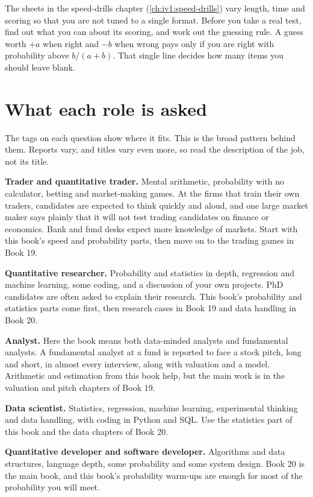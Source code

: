 The sheets in the speed-drills chapter (\cref{ch:iv1:speed-drills}) vary length, time and scoring so that you are not tuned to a single format. Before you take a real test, find out what you can about its scoring, and work out the guessing rule. A guess worth $+a$ when right and $-b$ when wrong pays only if you are right with probability above $b/(a + b)$. That single line decides how many items you should leave blank.

\section{What each role is asked}

The tags on each question show where it fits. This is the broad pattern behind them. Reports vary, and titles vary even more, so read the description of the job, not its title.

\textbf{Trader and quantitative trader.} Mental arithmetic, probability with no calculator, betting and market-making games. At the firms that train their own traders, candidates are expected to think quickly and aloud, and one large market maker says plainly that it will not test trading candidates on finance or economics. Bank and fund desks expect more knowledge of markets. Start with this book's speed and probability parts, then move on to the trading games in Book 19.

\textbf{Quantitative researcher.} Probability and statistics in depth, regression and machine learning, some coding, and a discussion of your own projects. PhD candidates are often asked to explain their research. This book's probability and statistics parts come first, then research cases in Book 19 and data handling in Book 20.

\textbf{Analyst.} Here the book means both data-minded analysts and fundamental analysts. A fundamental analyst at a fund is reported to face a stock pitch, long and short, in almost every interview, along with valuation and a model. Arithmetic and estimation from this book help, but the main work is in the valuation and pitch chapters of Book 19.

\textbf{Data scientist.} Statistics, regression, machine learning, experimental thinking and data handling, with coding in Python and SQL. Use the statistics part of this book and the data chapters of Book 20.

\textbf{Quantitative developer and software developer.} Algorithms and data structures, language depth, some probability and some system design. Book 20 is the main book, and this book's probability warm-ups are enough for most of the probability you will meet.

